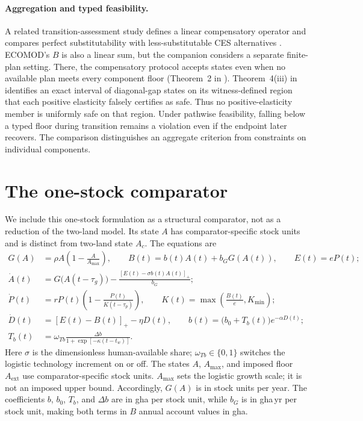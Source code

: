 \documentclass[11pt,a4paper]{article}
\newcommand{\pos}[1]{\left[#1\right]_+}
\begin{document}
\paragraph{Aggregation and typed feasibility.} A related transition-assessment study defines a linear compensatory operator and compares perfect substitutability with less-substitutable CES alternatives \citep[Sections~2 and 4 of][]{Abaee2026b}. ECOMOD's $B$ is also a linear sum, but the companion considers a separate finite-plan setting. There, the compensatory protocol accepts states even when no available plan meets every component floor (Theorem~2 in \citet{Abaee2026b}). Theorem~4(iii) in \citet{Abaee2026b} identifies an exact interval of diagonal-gap states on its witness-defined region that each positive elasticity falsely certifies as safe. Thus no positive-elasticity member is uniformly safe on that region. Under pathwise feasibility, falling below a typed floor during transition remains a violation even if the endpoint later recovers. The comparison distinguishes an aggregate criterion from constraints on individual components.

\section{The one-stock comparator}\label{si:onestock}

We include this one-stock formulation as a structural comparator, not as a reduction of the two-land model. Its state $A$ has comparator-specific stock units and is distinct from two-land state $A_c$. The equations are
\begin{align*}
G(A)&=\rho A\left(1-\frac{A}{A_{\max}}\right),\qquad
B(t)=b(t)A(t)+b_GG(A(t)),\qquad E(t)=eP(t);\\
\dot A(t)&=G\bigl(A(t-\tau_g)\bigr)-\frac{\pos{E(t)-\sigma b(t)A(t)}}{b_G};\\
\dot P(t)&=rP(t)\left(1-\frac{P(t)}{K(t-\tau_p)}\right),\qquad
K(t)=\max\!\left(\frac{B(t)}{e},K_{\min}\right);\\
\dot D(t)&=\pos{E(t)-B(t)}-\eta D(t),\qquad
b(t)=\bigl(b_0+T_b(t)\bigr)e^{-\alpha D(t)};\\
T_b(t)&=\omega_{Tb}\frac{\Delta b}{1+\exp[-\kappa(t-t_w)]}.
\end{align*}
Here $\sigma$ is the dimensionless human-available share; $\omega_{Tb}\in\{0,1\}$ switches the logistic technology increment on or off. The states $A$, $A_{\max}$, and imposed floor $A_{\mathrm{ext}}$ use comparator-specific stock units. $A_{\max}$ sets the logistic growth scale; it is not an imposed upper bound. Accordingly, $G(A)$ is in stock units per year. The coefficients $b$, $b_0$, $T_b$, and $\Delta b$ are in gha per stock unit, while $b_G$ is in gha\,yr per stock unit, making both terms in $B$ annual account values in gha.
\end{document}
